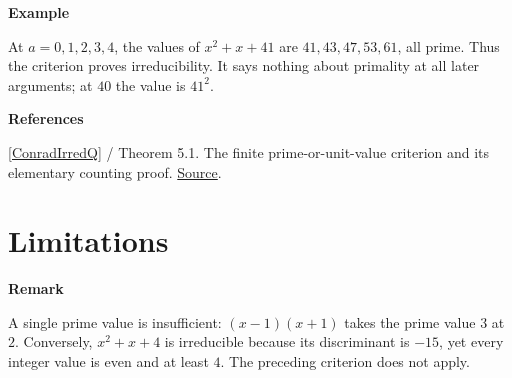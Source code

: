 \documentclass[11pt,a4paper,oneside,openany]{book}
\newenvironment{sources}{\par\smallskip\begingroup\footnotesize\color{atlasgray}\leftskip=10pt\setlength{\parskip}{2pt}}{\par\endgroup\smallskip}
\begin{document}
\begin{atlasblock}[standard]
\textbf{\sffamily Example}\par\smallskip
\color{black} At \(a=0,1,2,3,4\), the values of \(x^2+x+41\) are \(41,43,47,53,61\), all prime. Thus the criterion proves irreducibility. It says nothing about primality at all later arguments; at \(40\) the value is \(41^2\).\par
\end{atlasblock}\color{black}
\begin{sources}
\textbf{References}\par\smallskip
\noindent\hyperlink{ref:ConradIrredQ}{[ConradIrredQ]} / Theorem 5.1. The finite prime-or-unit-value criterion and its elementary counting proof. \href{https://kconrad.math.uconn.edu/blurbs/ringtheory/irredtestsoverQ.pdf}{Source}.\par
\end{sources}\color{black}
\section{Limitations}

\begin{atlasblock}[boundary]
\textbf{\sffamily Remark}\par\smallskip
\color{black} A single prime value is insufficient: \((x-1)(x+1)\) takes the prime value \(3\) at \(2\). Conversely, \(x^2+x+4\) is irreducible because its discriminant is \(-15\), yet every integer value is even and at least \(4\). The preceding criterion does not apply.\par
\end{atlasblock}\color{black}
\end{document}
